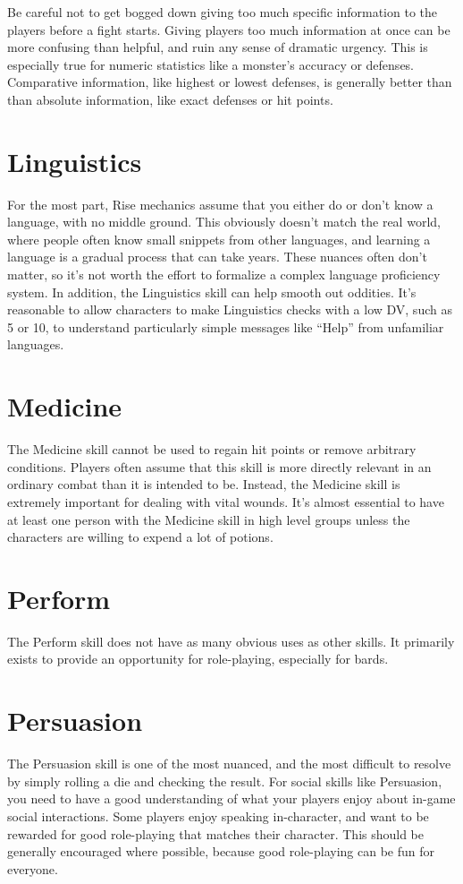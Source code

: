         Be careful not to get bogged down giving too much specific information to the players before a fight starts.
        Giving players too much information at once can be more confusing than helpful, and ruin any sense of dramatic urgency.
        This is especially true for numeric statistics like a monster's accuracy or defenses.
        Comparative information, like highest or lowest defenses, is generally better than than absolute information, like exact defenses or hit points.

\section{Linguistics}

    For the most part, Rise mechanics assume that you either do or don't know a language, with no middle ground.
    This obviously doesn't match the real world, where people often know small snippets from other languages, and learning a language is a gradual process that can take years.
    These nuances often don't matter, so it's not worth the effort to formalize a complex language proficiency system.
    In addition, the Linguistics skill can help smooth out oddities.
    It's reasonable to allow characters to make Linguistics checks with a low DV, such as 5 or 10, to understand particularly simple messages like ``Help'' from unfamiliar languages.

\section{Medicine}
    The Medicine skill cannot be used to regain hit points or remove arbitrary conditions.
    Players often assume that this skill is more directly relevant in an ordinary combat than it is intended to be.
    Instead, the Medicine skill is extremely important for dealing with vital wounds.
    It's almost essential to have at least one person with the Medicine skill in high level groups unless the characters are willing to expend a lot of potions.

\section{Perform}
    The Perform skill does not have as many obvious uses as other skills.
    It primarily exists to provide an opportunity for role-playing, especially for bards.

\section{Persuasion}
    The Persuasion skill is one of the most nuanced, and the most difficult to resolve by simply rolling a die and checking the result.
    For social skills like Persuasion, you need to have a good understanding of what your players enjoy about in-game social interactions.
    Some players enjoy speaking in-character, and want to be rewarded for good role-playing that matches their character.
    This should be generally encouraged where possible, because good role-playing can be fun for everyone.

